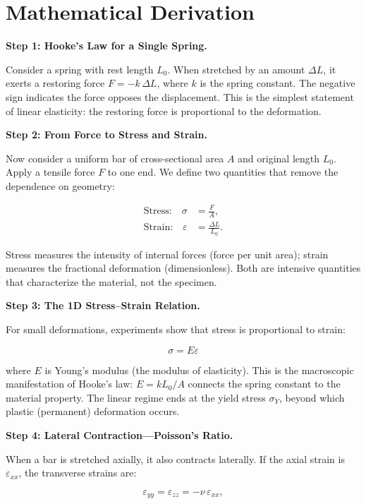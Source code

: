 \section*{Mathematical Derivation}

\textbf{Step 1: Hooke's Law for a Single Spring.}

Consider a spring with rest length $L_0$. When stretched by an amount $\Delta L$, it exerts a restoring force $F = -k\,\Delta L$, where $k$ is the spring constant. The negative sign indicates the force opposes the displacement. This is the simplest statement of linear elasticity: the restoring force is proportional to the deformation.

\textbf{Step 2: From Force to Stress and Strain.}

Now consider a uniform bar of cross-sectional area $A$ and original length $L_0$. Apply a tensile force $F$ to one end. We define two quantities that remove the dependence on geometry:

\begin{align}
\text{Stress:} \quad \sigma &= \frac{F}{A}, \\
\text{Strain:} \quad \varepsilon &= \frac{\Delta L}{L_0}.
\end{align}

Stress measures the intensity of internal forces (force per unit area); strain measures the fractional deformation (dimensionless). Both are intensive quantities that characterize the material, not the specimen.

\textbf{Step 3: The 1D Stress--Strain Relation.}

For small deformations, experiments show that stress is proportional to strain:

\begin{equation}
\boxed{\sigma = E\varepsilon}
\end{equation}

where $E$ is Young's modulus (the modulus of elasticity). This is the macroscopic manifestation of Hooke's law: $E = kL_0/A$ connects the spring constant to the material property. The linear regime ends at the yield stress $\sigma_Y$, beyond which plastic (permanent) deformation occurs.

\textbf{Step 4: Lateral Contraction---Poisson's Ratio.}

When a bar is stretched axially, it also contracts laterally. If the axial strain is $\varepsilon_{xx}$, the transverse strains are:

\begin{equation}
\varepsilon_{yy} = \varepsilon_{zz} = -\nu\,\varepsilon_{xx},
\end{equation}

